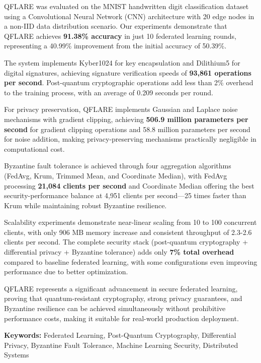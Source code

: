 \documentclass[12pt,a4paper]{article}
\begin{document}
QFLARE was evaluated on the MNIST handwritten digit classification dataset using a Convolutional Neural Network (CNN) architecture with 20 edge nodes in a non-IID data distribution scenario. Our experiments demonstrate that QFLARE achieves \textbf{91.38\% accuracy} in just 10 federated learning rounds, representing a 40.99\% improvement from the initial accuracy of 50.39\%.

The system implements Kyber1024 for key encapsulation and Dilithium5 for digital signatures, achieving signature verification speeds of \textbf{93,861 operations per second}. Post-quantum cryptographic operations add less than 2\% overhead to the training process, with an average of 0.209 seconds per round.

For privacy preservation, QFLARE implements Gaussian and Laplace noise mechanisms with gradient clipping, achieving \textbf{506.9 million parameters per second} for gradient clipping operations and 58.8 million parameters per second for noise addition, making privacy-preserving mechanisms practically negligible in computational cost.

Byzantine fault tolerance is achieved through four aggregation algorithms (FedAvg, Krum, Trimmed Mean, and Coordinate Median), with FedAvg processing \textbf{21,084 clients per second} and Coordinate Median offering the best security-performance balance at 4,951 clients per second---25 times faster than Krum while maintaining robust Byzantine resilience.

Scalability experiments demonstrate near-linear scaling from 10 to 100 concurrent clients, with only 906 MB memory increase and consistent throughput of 2.3-2.6 clients per second. The complete security stack (post-quantum cryptography + differential privacy + Byzantine tolerance) adds only \textbf{7\% total overhead} compared to baseline federated learning, with some configurations even improving performance due to better optimization.

QFLARE represents a significant advancement in secure federated learning, proving that quantum-resistant cryptography, strong privacy guarantees, and Byzantine resilience can be achieved simultaneously without prohibitive performance costs, making it suitable for real-world production deployment.

\textbf{Keywords:} Federated Learning, Post-Quantum Cryptography, Differential Privacy, Byzantine Fault Tolerance, Machine Learning Security, Distributed Systems

\newpage
{}
\setcounter{page}{1}
\renewcommand{\contentsname}{Table of Contents}
\tableofcontents
\thispagestyle{plain}
\end{document}
